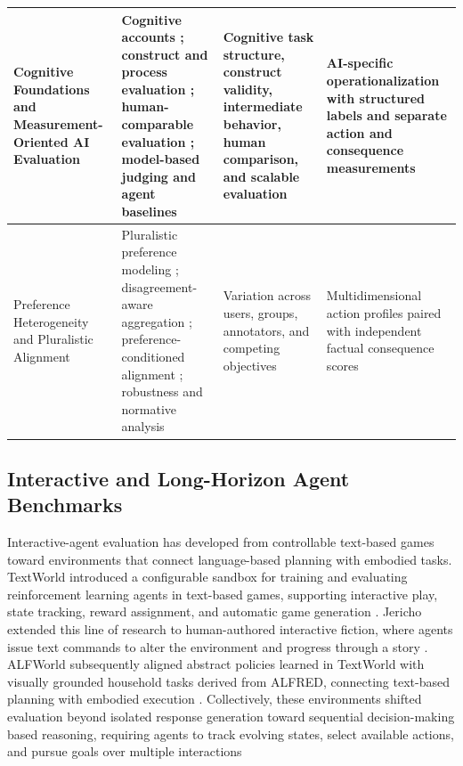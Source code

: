 \documentclass[pdflatex,sn-mathphys-num]{sn-jnl}%
\theoremstyle{thmstyleone}%
\theoremstyle{thmstyletwo}%
\theoremstyle{thmstylethree}%
\begin{document}
\begin{table}
\begin{tabular}{p{} p{} p{} p{}}
\midrule
Cognitive Foundations and Measurement-Oriented AI Evaluation & Cognitive accounts \cite{atance2001episodic,suddendorf2007evolution,schacter2007cognitive}; construct and process evaluation \cite{bean2025measuring,gururangan2018annotation,ma2024agentboard,he2025trajectbencha}; human-comparable evaluation \cite{mialon2023gaia,rein2025hcast,wijk2024rebench,cowley2022framework,lee2022evaluating}; model-based judging and agent baselines \cite{zheng2023judging,liu2023geval,lee2025checkeval,yao2022react,fu2025preact,majumder2023clin,wang2024agent} & Cognitive task structure, construct validity, intermediate behavior, human comparison, and scalable evaluation & AI-specific operationalization with structured labels and separate action and consequence measurements \\
\midrule
Preference Heterogeneity and Pluralistic Alignment & Pluralistic preference modeling \cite{chakraborty2024maxmin,zhao2023group,chen2024pal,sorensen2024roadmap}; disagreement-aware aggregation \cite{zhang2024general,fleisig2023when,fornaciari2021beyond}; preference-conditioned alignment \cite{zhou2023beyond,yang2024rewards,jang2023personalized}; robustness and normative analysis \cite{wang2025when,casper2023open,zhixuan2024beyond} & Variation across users, groups, annotators, and competing objectives & Multidimensional action profiles paired with independent factual consequence scores \\
\bottomrule
\end{tabular}
\end{table}

\subsection{Interactive and Long-Horizon Agent Benchmarks}
Interactive-agent evaluation has developed from controllable text-based games toward environments that connect language-based planning with embodied tasks. TextWorld introduced a configurable sandbox for training and evaluating reinforcement learning agents in text-based games, supporting interactive play, state tracking, reward assignment, and automatic game generation \cite{cote2018textworld}. Jericho extended this line of research to human-authored interactive fiction, where agents issue text commands to alter the environment and progress through a story \cite{hausknecht2019interactive}. ALFWorld subsequently aligned abstract policies learned in TextWorld with visually grounded household tasks derived from ALFRED, connecting text-based planning with embodied execution \cite{shridhar2020alfworld}. Collectively, these environments shifted evaluation beyond isolated response generation toward sequential decision-making based reasoning, requiring agents to track evolving states, select available actions, and pursue goals over multiple interactions
\end{document}
